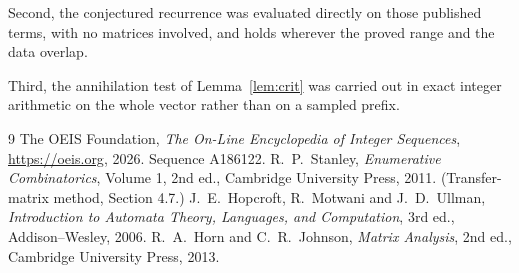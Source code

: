 \documentclass[11pt,a4paper]{article}
\theoremstyle{plain}
\theoremstyle{definition}
\begin{document}
Second, the conjectured recurrence was evaluated directly on those published terms, with no
matrices involved, and holds wherever the proved range and the data overlap.

Third, the annihilation test of Lemma~\ref{lem:crit} was carried out in exact integer
arithmetic on the whole vector rather than on a sampled prefix.

\begin{thebibliography}{9}
 The OEIS Foundation, \emph{The On-Line Encyclopedia of Integer
Sequences}, \url{https://oeis.org}, 2026. Sequence A186122.
 R.~P.~Stanley, \emph{Enumerative Combinatorics}, Volume 1, 2nd ed.,
Cambridge University Press, 2011. (Transfer-matrix method, Section 4.7.)
 J.~E.~Hopcroft, R.~Motwani and J.~D.~Ullman, \emph{Introduction to Automata
Theory, Languages, and Computation}, 3rd ed., Addison--Wesley, 2006.
 R.~A.~Horn and C.~R.~Johnson, \emph{Matrix Analysis}, 2nd ed., Cambridge
University Press, 2013.
\end{thebibliography}
\end{document}

